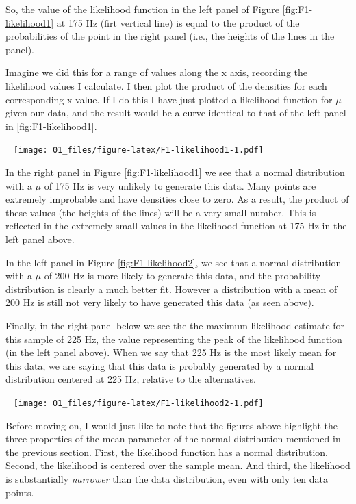 \documentclass[
]{book}
\begin{document}
So, the value of the likelihood function in the left panel of Figure \ref{fig:F1-likelihood1} at 175 Hz (firt vertical line) is equal to the product of the probabilities of the point in the right panel (i.e., the heights of the lines in the panel).

Imagine we did this for a range of values along the x axis, recording the likelihood values I calculate. I then plot the product of the densities for each corresponding x value. If I do this I have just plotted a likelihood function for \(\mu\) given our data, and the result would be a curve identical to that of the left panel in \ref{fig:F1-likelihood1}.

~
\texttt{[image: 01\_files/figure-latex/F1-likelihood1-1.pdf]}
~

In the right panel in Figure \ref{fig:F1-likelihood1} we see that a normal distribution with a \(\mu\) of 175 Hz is very unlikely to generate this data. Many points are extremely improbable and have densities close to zero. As a result, the product of these values (the heights of the lines) will be a very small number. This is reflected in the extremely small values in the likelihood function at 175 Hz in the left panel above.

In the left panel in Figure \ref{fig:F1-likelihood2}, we see that a normal distribution with a \(\mu\) of 200 Hz is more likely to generate this data, and the probability distribution is clearly a much better fit. However a distribution with a mean of 200 Hz is still not very likely to have generated this data (as seen above).

Finally, in the right panel below we see the the maximum likelihood estimate for this sample of 225 Hz, the value representing the peak of the likelihood function (in the left panel above). When we say that 225 Hz is the most likely mean for this data, we are saying that this data is probably generated by a normal distribution centered at 225 Hz, relative to the alternatives.

~
\texttt{[image: 01\_files/figure-latex/F1-likelihood2-1.pdf]}
~

Before moving on, I would just like to note that the figures above highlight the three properties of the mean parameter of the normal distribution mentioned in the previous section. First, the likelihood function has a normal distribution. Second, the likelihood is centered over the sample mean. And third, the likelihood is substantially \emph{narrower} than the data distribution, even with only ten data points.
\end{document}
